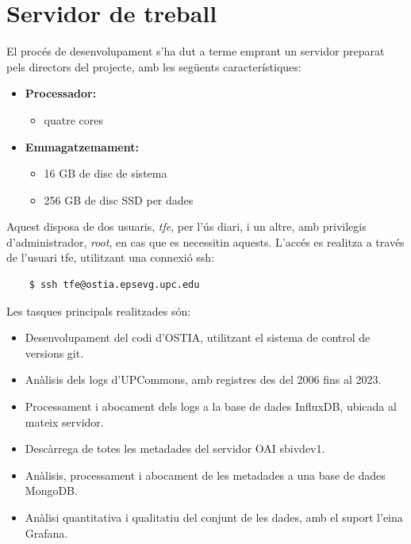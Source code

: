 \chapter{Servidor de treball}\label{ch:server-description}

El procés de desenvolupament s’ha dut a terme emprant un servidor preparat pels directors del projecte, amb les següents característiques:

\begin{itemize}
    \item \textbf{Processador:}
    \begin{itemize}
        \item quatre cores
    \end{itemize}
    \item \textbf{Emmagatzemament:}
    \begin{itemize}
        \item 16 GB de disc de sistema
        \item 256 GB de disc SSD per dades
    \end{itemize}
\end{itemize}

\noindent
Aquest disposa de dos usuaris, \textit{tfe}, per l’ús diari, i un altre, amb privilegis d’administrador, \textit{root}, en cas que es necessitin aquests.
L’accés es realitza a través de l’usuari tfe, utilitzant una connexió \gls{ssh}:

\begin{verbatim}
    $ ssh tfe@ostia.epsevg.upc.edu
\end{verbatim}

\noindent
Les tasques principals realitzades són:

\begin{itemize}
    \item Desenvolupament del codi d’\gls{OSTIA}, utilitzant el sistema de control de versions git.
    \item Anàlisis dels logs d’\gls{UPCommons}, amb registres des del 2006 fins al 2023.
    \item Processament i abocament dels logs a la base de dades InfluxDB, ubicada al mateix servidor.
    \item Descàrrega de totes les metadades del servidor \gls{OAI} sbivdev1.
    \item Anàlisis, processament i abocament de les metadades a una base de dades MongoDB.
    \item Anàlisi quantitativa i qualitatiu del conjunt de les dades, amb el suport l’eina Grafana.
\end{itemize}

